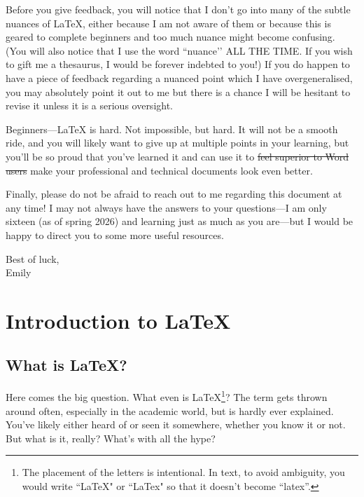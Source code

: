 \documentclass[letterpaper, 12pt]{article}
\begin{document}
Before you give feedback, you will notice that I don’t go into many of the subtle nuances of \LaTeX, either because I am not aware of them or because this is geared to complete beginners and too much nuance might become confusing. (You will also notice that I use the word ``nuance’’ ALL THE TIME. If you wish to gift me a thesaurus, I would be forever indebted to you!) If you do happen to have a piece of feedback regarding a nuanced point which I have overgeneralised, you may absolutely point it out to me but there is a chance I will be hesitant to revise it unless it is a serious oversight.

Beginners---\LaTeX{} is hard. Not impossible, but hard. It will not be a smooth ride, and you will likely want to give up at multiple points in your learning, but you’ll be so proud that you’ve learned it and can use it to \sout{feel superior to Word users} make your professional and technical documents look even better.

Finally, please do not be afraid to reach out to me regarding this document at any time! I may not always have the answers to your questions---I am only sixteen (as of spring 2026) and learning just as much as you are---but I would be happy to direct you to some more useful resources.

Best of luck,\\
Emily

\newpage

\fancyhead[L]{\nouppercase{\leftmark}}   %
\fancyhead[R]{\nouppercase{\rightmark}}  %
\fancyfoot[C]{\thepage}
\renewcommand{\sectionmark}[1]{
  \markboth{\thesection\ \textsc{#1}}{}}
\renewcommand{\subsectionmark}[1]{
  \markright{\thesubsection\ \textsc{#1}}}

\section{Introduction to \LaTeX}

\subsection{What is \LaTeX?}

Here comes the big question. What even is \LaTeX\footnote{The placement of the letters is intentional. In text, to avoid ambiguity, you would write ``LaTeX" or ``LaTex" so that it doesn't become ``latex''.}? The term gets thrown around often, especially in the academic world, but is hardly ever explained. You've likely either heard of or seen it somewhere, whether you know it or not. But what is it, really? What's with all the hype?
\end{document}
